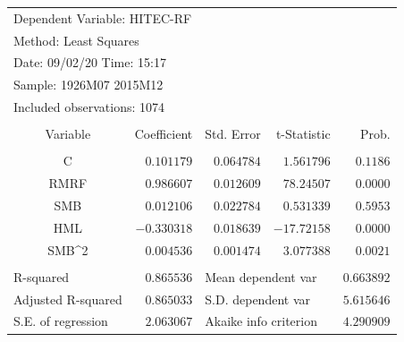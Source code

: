 \documentclass[12pt]{article}
\numberwithin{equation}{section} %
\begin{document}
\begin{table}[H]
\centering
\begin{tabular}{lrrrr}
\multicolumn{3}{l}{Dependent Variable: HITEC-RF}&\multicolumn{1}{c}{}&\multicolumn{1}{c}{}\\
\multicolumn{2}{l}{Method: Least Squares}&\multicolumn{1}{c}{}&\multicolumn{1}{c}{}&\multicolumn{1}{c}{}\\
\multicolumn{2}{l}{Date: 09/02/20   Time: 15:17}&\multicolumn{1}{c}{}&\multicolumn{1}{c}{}&\multicolumn{1}{c}{}\\
\multicolumn{2}{l}{Sample: 1926M07 2015M12}&\multicolumn{1}{c}{}&\multicolumn{1}{c}{}&\multicolumn{1}{c}{}\\
\multicolumn{3}{l}{Included observations: 1074}&\multicolumn{1}{c}{}&\multicolumn{1}{c}{}\\
[4.5pt] \hline \\ [-4.5pt]
\multicolumn{1}{c}{Variable}&\multicolumn{1}{r}{Coefficient}&\multicolumn{1}{r}{Std. Error}&\multicolumn{1}{r}{t-Statistic}&\multicolumn{1}{r}{Prob.}\\
[4.5pt] \hline \\ [-4.5pt]
\multicolumn{1}{c}{C}&\multicolumn{1}{r}{$0.101179$}&\multicolumn{1}{r}{$0.064784$}&\multicolumn{1}{r}{$1.561796$}&\multicolumn{1}{r}{$0.1186$}\\
\multicolumn{1}{c}{RMRF}&\multicolumn{1}{r}{$0.986607$}&\multicolumn{1}{r}{$0.012609$}&\multicolumn{1}{r}{$78.24507$}&\multicolumn{1}{r}{$0.0000$}\\
\multicolumn{1}{c}{SMB}&\multicolumn{1}{r}{$0.012106$}&\multicolumn{1}{r}{$0.022784$}&\multicolumn{1}{r}{$0.531339$}&\multicolumn{1}{r}{$0.5953$}\\
\multicolumn{1}{c}{HML}&\multicolumn{1}{r}{$-0.330318$}&\multicolumn{1}{r}{$0.018639$}&\multicolumn{1}{r}{$-17.72158$}&\multicolumn{1}{r}{$0.0000$}\\
\multicolumn{1}{c}{SMB\textasciicircum 2}&\multicolumn{1}{r}{$0.004536$}&\multicolumn{1}{r}{$0.001474$}&\multicolumn{1}{r}{$3.077388$}&\multicolumn{1}{r}{$0.0021$}\\
[4.5pt] \hline \\ [-4.5pt]
\multicolumn{1}{l}{R-squared}&\multicolumn{1}{r}{$0.865536$}&\multicolumn{2}{l}{Mean dependent var}&\multicolumn{1}{r}{$0.663892$}\\
\multicolumn{1}{l}{Adjusted R-squared}&\multicolumn{1}{r}{$0.865033$}&\multicolumn{2}{l}{S.D. dependent var}&\multicolumn{1}{r}{$5.615646$}\\
\multicolumn{1}{l}{S.E. of regression}&\multicolumn{1}{r}{$2.063067$}&\multicolumn{2}{l}{Akaike info criterion}&\multicolumn{1}{r}{$4.290909$}\\

\end{tabular}
\end{table}
\end{document}
